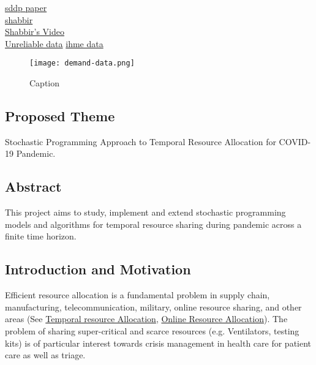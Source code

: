 \documentclass[11pt,letterpaper]{article}
\begin{document}
\begin{comment}
Deadline 1: March 29, a brief write up\\
Deadline 2: April 4/5- A slightly concrete proposal\\
Deadline 3: April 6-Write up each other's parts. \\
Deadline 4: April-6 Mail proposal by midnight . 


Meeting Scheduled on April 6-5pm\\
Short meeting on April 6 - 7pm. (Discuss proposal and next meeting) 

\newpage
\end{comment}
\href{http://www.optimization-online.org/DB_FILE/2015/08/5064.pdf}{sddp paper}\\
\href{https://www.ima.umn.edu/materials/2015-2016/ND8.1-12.16/25386/mssp.pdf}{shabbir}\\
\href{https://www.ima.umn.edu/2015-2016/ND8.1-12.16/25386}{Shabbir's Video}\\
\href{https://www.reuters.com/article/us-health-coronavirus-usa-ventilators/outbid-and-left-hanging-u-s-states-scramble-for-ventilators-idUSKCN21S20D}{Unreliable data}
\href{https://covid19.healthdata.org/united-states-of-america}{ihme data}
\begin{figure}
    \centering
    \texttt{[image: demand-data.png]}
    \caption{Caption}
    \label{fig:my_label}
\end{figure}
\subsection*{Proposed Theme}
Stochastic Programming Approach to Temporal Resource Allocation for COVID-19 Pandemic.

\subsection*{Abstract}
This project aims to study, implement and extend stochastic programming models and algorithms for temporal resource sharing during pandemic across a finite time horizon.  

\subsection*{Introduction and Motivation}
Efficient resource allocation is a fundamental problem in supply chain, manufacturing, telecommunication, military, online resource sharing, and other areas (See \href{https://apps.dtic.mil/dtic/tr/fulltext/u2/a423115.pdf}{Temporal resource Allocation}, \href{https://arxiv.org/pdf/1610.02143.pdf}{Online Resource Allocation}). The problem of sharing super-critical and scarce resources (e.g. Ventilators, testing kits) is of particular interest towards crisis management in health care for patient care as well as triage.   
\end{document}
